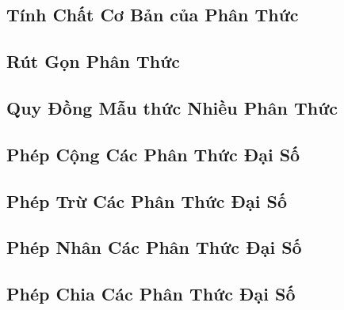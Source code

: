\documentclass{article}
\numberwithin{equation}{section}
\begin{document}

\subsection{Tính Chất Cơ Bản của Phân Thức}


\subsection{Rút Gọn Phân Thức}


\subsection{Quy Đồng Mẫu thức Nhiều Phân Thức}


\subsection{Phép Cộng Các Phân Thức Đại Số}


\subsection{Phép Trừ Các Phân Thức Đại Số}


\subsection{Phép Nhân Các Phân Thức Đại Số}


\subsection{Phép Chia Các Phân Thức Đại Số}

\end{document}
